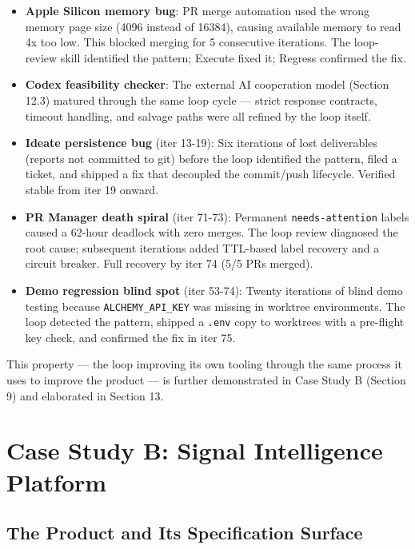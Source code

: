 \documentclass[11pt,a4paper]{article}
\providecommand{\tightlist}{%
  \setlength{\itemsep}{0pt}\setlength{\parskip}{0pt}}
\begin{document}
\begin{itemize}
\tightlist
\item
  \textbf{Apple Silicon memory bug}: PR merge automation used the wrong memory page size (4096 instead of 16384), causing available memory to read 4x too low. This blocked merging for 5 consecutive iterations. The loop-review skill identified the pattern; Execute fixed it; Regress confirmed the fix.
\item
  \textbf{Codex feasibility checker}: The external AI cooperation model (Section 12.3) matured through the same loop cycle --- strict response contracts, timeout handling, and salvage paths were all refined by the loop itself.
\item
  \textbf{Ideate persistence bug} (iter 13-19): Six iterations of lost deliverables (reports not committed to git) before the loop identified the pattern, filed a ticket, and shipped a fix that decoupled the commit/push lifecycle. Verified stable from iter 19 onward.
\item
  \textbf{PR Manager death spiral} (iter 71-73): Permanent \texttt{needs-attention} labels caused a 62-hour deadlock with zero merges. The loop review diagnosed the root cause; subsequent iterations added TTL-based label recovery and a circuit breaker. Full recovery by iter 74 (5/5 PRs merged).
\item
  \textbf{Demo regression blind spot} (iter 53-74): Twenty iterations of blind demo testing because \texttt{ALCHEMY\_API\_KEY} was missing in worktree environments. The loop detected the pattern, shipped a \texttt{.env} copy to worktrees with a pre-flight key check, and confirmed the fix in iter 75.
\end{itemize}

This property --- the loop improving its own tooling through the same process it uses to improve the product --- is further demonstrated in Case Study B (Section 9) and elaborated in Section 13.


\clearpage
\section{Case Study B: Signal Intelligence Platform}\label{sec:case-study-b-signal-intelligence-platform}

\subsection{The Product and Its Specification Surface}\label{sec:product-and-its-specification-surface-1}
\end{document}

